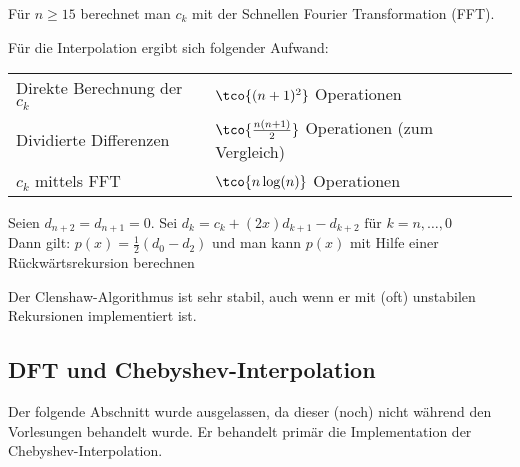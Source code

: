 Für $n \geq 15$ berechnet man $c_k$ mit der Schnellen Fourier Transformation (FFT).

 Für die Interpolation ergibt sich folgender Aufwand:
\begin{center}
	\begin{tabular}{ll}
		Direkte Berechnung der $c_k$ & $\tco{(n + 1)^2}$ Operationen                           \\
		Dividierte Differenzen       & $\tco{\frac{n (n + 1)}{2}}$ Operationen (zum Vergleich) \\
		$c_k$ mittels FFT            & $\tco{n \log(n)}$ Operationen
	\end{tabular}
\end{center}


 Seien $d_{n + 2} = d_{n + 1} = 0$. Sei $d_k = c_k + (2x)d_{k + 1} - d_{k + 2} \text{ für } k = n, \ldots, 0$\\
Dann gilt: $p(x) = \frac{1}{2}(d_0 - d_2)$ und man kann $p(x)$ mit Hilfe einer Rückwärtsrekursion berechnen

Der Clenshaw-Algorithmus ist sehr stabil, auch wenn er mit (oft) unstabilen Rekursionen implementiert ist.



\subsection{DFT und Chebyshev-Interpolation}
Der folgende Abschnitt wurde ausgelassen, da dieser (noch) nicht während den Vorlesungen behandelt wurde.
Er behandelt primär die Implementation der Chebyshev-Interpolation.
